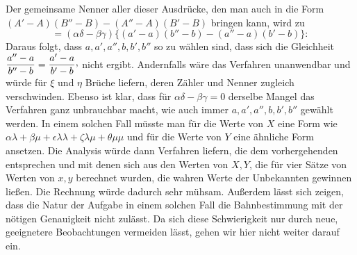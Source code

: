 Der gemeinsame Nenner aller dieser Ausdrücke, den man auch in die Form $(A'-A)(B''-B)-(A''-A)(B'-B)$ bringen kann, wird zu
\[
=(\alpha\delta-\beta\gamma)\{(a'-a)(b''-b)-(a''-a)(b'-b)\}:
\]
Daraus folgt, dass $a,a',a'',b,b',b''$ so zu wählen sind, dass sich die Gleichheit $\dfrac{a''-a}{b''-b}=\dfrac{a'-a}{b'-b}\mathpunct{\raisebox{.45ex}{,}}$ nicht ergibt. Andernfalls wäre das Verfahren unanwendbar und würde für $\xi$ und $\eta$ Brüche liefern, deren Zähler und Nenner zugleich verschwinden. Ebenso ist klar, dass für $\alpha\delta-\beta\gamma=0$ derselbe Mangel das Verfahren ganz unbrauchbar macht, wie auch immer $a,a',a'',b,b',b''$ gewählt werden. In einem solchen Fall müsste man für die Werte von $X$ eine Form wie $\alpha\lambda+\beta\mu+\epsilon\lambda\lambda+\zeta\lambda\mu+\theta\mu\mu$ und für die Werte von $Y$ eine ähnliche Form ansetzen. Die Analysis würde dann Verfahren liefern, die dem vorhergehenden entsprechen und mit denen sich aus den Werten von $X,Y$, die für vier Sätze von Werten von $x,y$ berechnet wurden, die wahren Werte der Unbekannten gewinnen ließen. Die Rechnung würde dadurch sehr mühsam. Außerdem lässt sich zeigen, dass die Natur der Aufgabe in einem solchen Fall die Bahnbestimmung mit der nötigen Genauigkeit nicht zulässt. Da sich diese Schwierigkeit nur durch neue, geeignetere Beobachtungen vermeiden lässt, gehen wir hier nicht weiter darauf ein.
